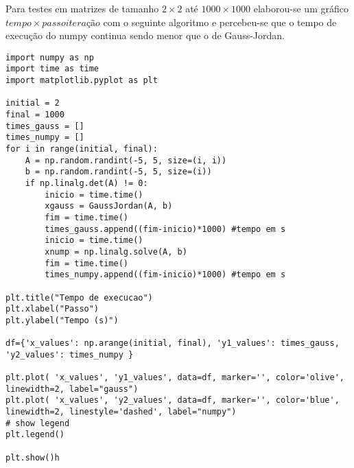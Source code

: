 Para testes em matrizes de tamanho $2 \times 2$ até $1000 \times 1000$ elaborou-se um gráfico $tempo \times passo iteração$ com o seguinte algoritmo e percebeu-se que o tempo de execução do numpy continua sendo menor que o de Gauss-Jordan.\\


\begin{lstlisting}
import numpy as np
import time as time
import matplotlib.pyplot as plt

initial = 2
final = 1000
times_gauss = []
times_numpy = []
for i in range(initial, final):
    A = np.random.randint(-5, 5, size=(i, i))
    b = np.random.randint(-5, 5, size=(i))
    if np.linalg.det(A) != 0:
        inicio = time.time()
        xgauss = GaussJordan(A, b)
        fim = time.time()
        times_gauss.append((fim-inicio)*1000) #tempo em s
        inicio = time.time()
        xnump = np.linalg.solve(A, b)
        fim = time.time()  
        times_numpy.append((fim-inicio)*1000) #tempo em s

plt.title("Tempo de execucao")
plt.xlabel("Passo")
plt.ylabel("Tempo (s)")

df={'x_values': np.arange(initial, final), 'y1_values': times_gauss, 
'y2_values': times_numpy }
 
plt.plot( 'x_values', 'y1_values', data=df, marker='', color='olive',
linewidth=2, label="gauss")
plt.plot( 'x_values', 'y2_values', data=df, marker='', color='blue', 
linewidth=2, linestyle='dashed', label="numpy")
# show legend
plt.legend()

plt.show()h
\end{lstlisting}